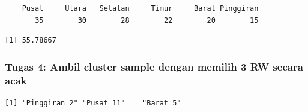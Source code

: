 \documentclass[
  indonesian,
  letterpaper,
]{book}
\newenvironment{Shaded}{\begin{snugshade}}{\end{snugshade}}
\newcommand{\ControlFlowTok}[1]{\textcolor[rgb]{0.00,0.23,0.31}{\textbf{#1}}}
\newcommand{\DecValTok}[1]{\textcolor[rgb]{0.68,0.00,0.00}{#1}}
\newcommand{\FunctionTok}[1]{\textcolor[rgb]{0.28,0.35,0.67}{#1}}
\newcommand{\NormalTok}[1]{\textcolor[rgb]{0.00,0.23,0.31}{#1}}
\newcommand{\OtherTok}[1]{\textcolor[rgb]{0.00,0.23,0.31}{#1}}
\newcommand{\SpecialCharTok}[1]{\textcolor[rgb]{0.37,0.37,0.37}{#1}}
\begin{document}
\begin{verbatim}
    Pusat     Utara   Selatan     Timur     Barat Pinggiran 
       35        30        28        22        20        15 
\end{verbatim}

\begin{Shaded}
\end{Shaded}

\begin{verbatim}
[1] 55.78667
\end{verbatim}

\subsubsection{Tugas 4: Ambil cluster sample dengan memilih 3 RW secara
acak}\label{tugas-4-ambil-cluster-sample-dengan-memilih-3-rw-secara-acak}

\begin{Shaded}
\end{Shaded}

\begin{verbatim}
[1] "Pinggiran 2" "Pusat 11"    "Barat 5"    
\end{verbatim}

\begin{Shaded}
\end{Shaded}
\end{document}
